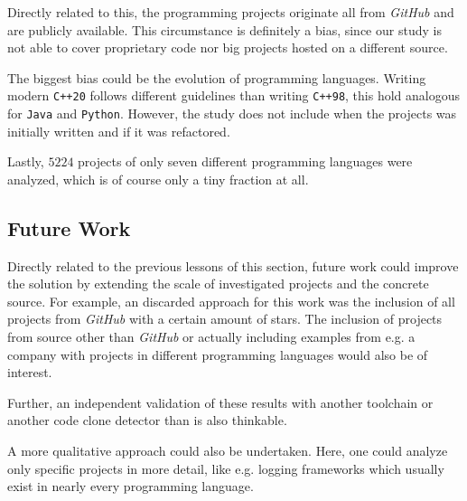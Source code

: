 Directly related to this, the programming projects originate all from \textit{GitHub} and are publicly available. This circumstance is definitely a bias, since our study is not able to cover proprietary code nor big projects hosted on a different source.

The biggest bias could be the evolution of programming languages. Writing modern \texttt{C++20} follows different guidelines than writing \texttt{C++98}, this hold analogous for \texttt{Java} and \texttt{Python}. However, the study does not include when the projects was initially written and if it was refactored.

Lastly, $5224$ projects of only seven different programming languages were analyzed, which is of course only a tiny fraction at all.

\subsection{Future Work}

Directly related to the previous lessons of this section, future work could improve the solution by extending the scale of investigated projects and the concrete source. For example, an discarded approach for this work was the inclusion of all projects from \textit{GitHub} with a certain amount of stars. The inclusion of projects from source other than \textit{GitHub} or actually including examples from e.g. a company with projects in different programming languages would also be of interest.

Further, an independent validation of these results with another toolchain or another code clone detector than \teamscale{} is also thinkable.

A more qualitative approach could also be undertaken. Here, one could analyze only specific projects in more detail, like e.g. logging frameworks which usually exist in nearly every programming language.
 
